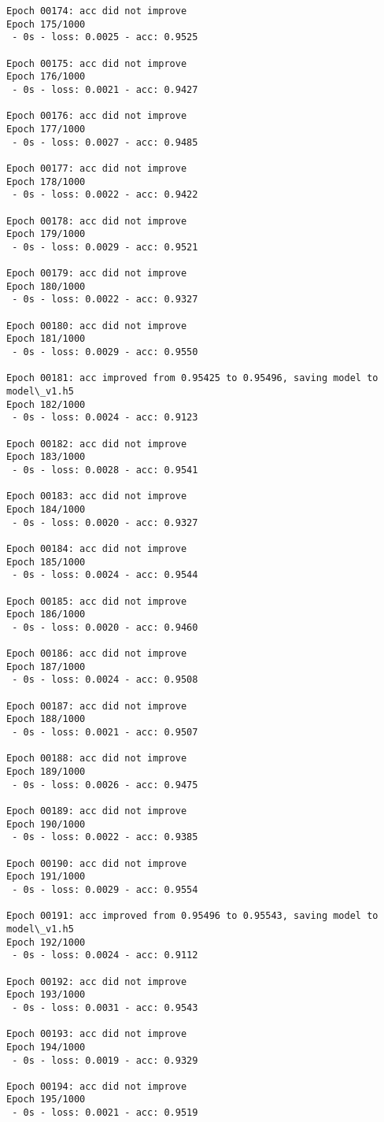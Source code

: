 \documentclass[11pt]{article}
\begin{document}
\begin{Verbatim}[commandchars=\\\{\}]
Epoch 00174: acc did not improve
Epoch 175/1000
 - 0s - loss: 0.0025 - acc: 0.9525

Epoch 00175: acc did not improve
Epoch 176/1000
 - 0s - loss: 0.0021 - acc: 0.9427

Epoch 00176: acc did not improve
Epoch 177/1000
 - 0s - loss: 0.0027 - acc: 0.9485

Epoch 00177: acc did not improve
Epoch 178/1000
 - 0s - loss: 0.0022 - acc: 0.9422

Epoch 00178: acc did not improve
Epoch 179/1000
 - 0s - loss: 0.0029 - acc: 0.9521

Epoch 00179: acc did not improve
Epoch 180/1000
 - 0s - loss: 0.0022 - acc: 0.9327

Epoch 00180: acc did not improve
Epoch 181/1000
 - 0s - loss: 0.0029 - acc: 0.9550

Epoch 00181: acc improved from 0.95425 to 0.95496, saving model to model\_v1.h5
Epoch 182/1000
 - 0s - loss: 0.0024 - acc: 0.9123

Epoch 00182: acc did not improve
Epoch 183/1000
 - 0s - loss: 0.0028 - acc: 0.9541

Epoch 00183: acc did not improve
Epoch 184/1000
 - 0s - loss: 0.0020 - acc: 0.9327

Epoch 00184: acc did not improve
Epoch 185/1000
 - 0s - loss: 0.0024 - acc: 0.9544

Epoch 00185: acc did not improve
Epoch 186/1000
 - 0s - loss: 0.0020 - acc: 0.9460

Epoch 00186: acc did not improve
Epoch 187/1000
 - 0s - loss: 0.0024 - acc: 0.9508

Epoch 00187: acc did not improve
Epoch 188/1000
 - 0s - loss: 0.0021 - acc: 0.9507

Epoch 00188: acc did not improve
Epoch 189/1000
 - 0s - loss: 0.0026 - acc: 0.9475

Epoch 00189: acc did not improve
Epoch 190/1000
 - 0s - loss: 0.0022 - acc: 0.9385

Epoch 00190: acc did not improve
Epoch 191/1000
 - 0s - loss: 0.0029 - acc: 0.9554

Epoch 00191: acc improved from 0.95496 to 0.95543, saving model to model\_v1.h5
Epoch 192/1000
 - 0s - loss: 0.0024 - acc: 0.9112

Epoch 00192: acc did not improve
Epoch 193/1000
 - 0s - loss: 0.0031 - acc: 0.9543

Epoch 00193: acc did not improve
Epoch 194/1000
 - 0s - loss: 0.0019 - acc: 0.9329

Epoch 00194: acc did not improve
Epoch 195/1000
 - 0s - loss: 0.0021 - acc: 0.9519


\end{Verbatim}
\end{document}
